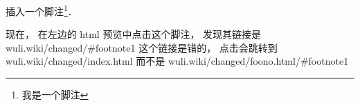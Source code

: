 
插入一个脚注\footnote{我是一个脚注}．

现在， 在左边的 html 预览中点击这个脚注， 发现其链接是 wuli.wiki/changed/#footnote1 这个链接是错的， 点击会跳转到 wuli.wiki/changed/index.html 而不是 wuli.wiki/changed/foono.html/#footnote1
